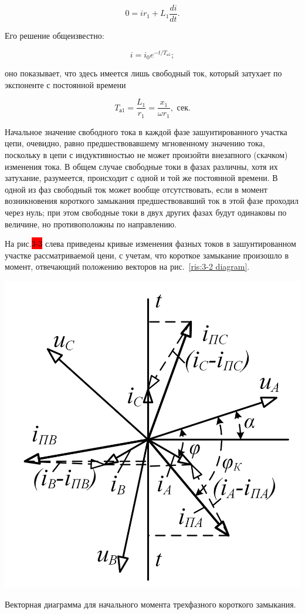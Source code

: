 \begin{equation}
	0 = ir_1 + L_1 \frac{di}{dt}.
	\label{eq:3-1 diff_ur}
\end{equation}

Его решение общеизвестно:

\begin{equation}
	i = i_0 e^{-t / T_{\text{а}1}}; %
	\label{eq:3-2 diff_solve}
\end{equation}

оно показывает, что здесь имеется лишь свободный ток, который затухает по экспоненте с постоянной времени

\begin{equation}
	T_{\text{а}1} = \frac{L_1}{r_1} = \frac{x_1}{\omega r_1}, \textit{~сек}.
	\label{eq:3-3 T_a1}
\end{equation}

Начальное значение свободного тока в каждой фазе зашунтированного участка цепи, очевидно, равно предшествовавшему мгновенному значению тока, поскольку в цепи с индуктивностью не может произойти внезапного (скачком) изменения тока. В общем случае свободные токи в фазах различны, хотя их затухание, разумеется, происходит с одной и той же постоянной времени. В одной из фаз свободный ток может вообще отсутствовать, если в момент возникновения короткого замыкания предшествовавший ток в этой фазе проходил через нуль; при этом свободные токи в двух других фазах будут одинаковы по величине, но противоположны по направлению.

На рис.\colorbox{red}{3-3} слева приведены кривые изменения фазных токов в зашунтированном участке рассматриваемой цени, с учетам, что короткое замыкание произошло в момент, отвечающий положению векторов на рис.~\ref{ris:3-2 diagram}.

\begin{floatingfigure}[lflt]{0.45\linewidth}
	\centering
	\includegraphics[width=0.40\linewidth]{pic/3-2}
	\caption{Векторная диаграмма для начального момента трехфазного короткого замыкания.}
	\label{ris:3-2 diagram}
\end{floatingfigure}

